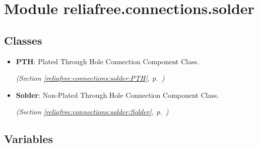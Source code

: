 %
%
%


\section{Module reliafree.connections.solder}

    \label{reliafree:connections:solder}


\subsection{Classes}

\begin{itemize}  \setlength{\parskip}{0ex}
  \item \textbf{PTH}: Plated Through Hole Connection Component Class.



  \textit{(Section \ref{reliafree:connections:solder:PTH}, p.~\pageref{reliafree:connections:solder:PTH})}

  \item \textbf{Solder}: Non-Plated Through Hole Connection Component Class.



  \textit{(Section \ref{reliafree:connections:solder:Solder}, p.~\pageref{reliafree:connections:solder:Solder})}

\end{itemize}


  \subsection{Variables}

